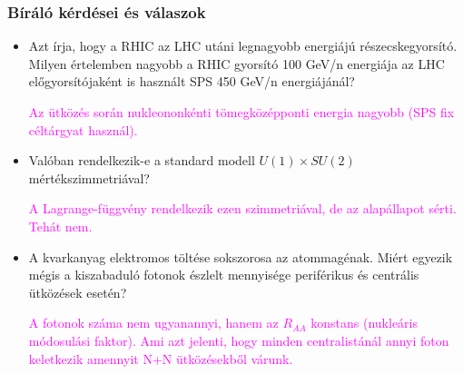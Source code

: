 \documentclass{beamer}
\begin{document}
\begin{frame}[noframenumbering]
\frametitle{Bíráló kérdései és válaszok}
\begin{itemize}
\fontsize{9}{16}\selectfont
\item Azt írja, hogy a RHIC az LHC utáni legnagyobb energiájú részecskegyorsító. Milyen értelemben nagyobb a RHIC gyorsító 100 GeV/n energiája az LHC előgyorsítójaként is használt SPS 450 GeV/n energiájánál?

\textcolor{magenta}{Az ütközés során nukleononkénti tömegközépponti energia nagyobb (SPS fix céltárgyat használ).}

\item Valóban rendelkezik-e a standard modell $U(1)\times SU(2)$ mértékszimmetriával?

\textcolor{magenta}{A Lagrange-függvény rendelkezik ezen szimmetriával, de az alapállapot sérti. Tehát nem.}

\item A kvarkanyag elektromos töltése sokszorosa az atommagénak. Miért egyezik mégis a kiszabaduló fotonok észlelt mennyisége periférikus és centrális ütközések esetén?

\textcolor{magenta}{A fotonok száma nem ugyanannyi, hanem az $R_{AA}$ konstans (nukleáris módosulási faktor). Ami azt jelenti, hogy minden centralistánál annyi foton keletkezik amennyit N+N ütközésekből várunk.}

\end{itemize}
\end{frame}
\end{document}
